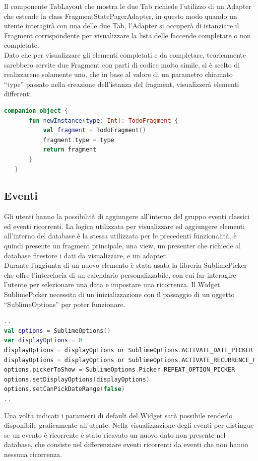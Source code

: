Il componente TabLayout che mostra le due Tab richiede l'utilizzo di un Adapter che estende la class FragmentStatePagerAdapter, in questo modo quando un utente interagirà con una delle due Tab, l'Adapter si occuperà di istanziare il Fragment corrispondente per visualizzare la lista delle faccende completate o non completate.\\
Dato che per visualizzare gli elementi completati e da completare, teoricamente sarebbero servite due Fragment con parti di codice molto simile, si è scelto di realizzarene solamente uno, che in base al valore di un parametro chiamato ``type'' passato nella creazione dell'istanza del fragment, visualizzerà elementi differenti.\\

\begin{lstlisting}[language=kotlin,caption={FragmentTodo.kt}]
companion object {
       fun newInstance(type: Int): TodoFragment {
           val fragment = TodoFragment()
           fragment.type = type
           return fragment
       }
   }
\end{lstlisting}


\subsection{Eventi}
Gli utenti hanno la possibilità di aggiungere all'interno del gruppo eventi classici ed eventi ricorrenti. La logica utilizzata per visualizzare ed aggiungere elementi all'interno del database è la stessa utilizzata per le precedenti funzionalità, è quindi presente un fragment principale, una view, un presenter che richiede al database firestore i dati da visualizzare, e un adapter.\\
Durante l'aggiunta di un nuovo elemento è stata usata la libreria SublimePicker che offre l'interefacia di un calendario personalizzabile, con cui far interagire l'utente per selezionare una data e impostare una ricorrenza. Il Widget SublimePicker necessita di un inizializzazione con il passaggio di un oggetto ``SublimeOptions'' per poter funzionare.\\

\begin{lstlisting}[language=kotlin,caption={Configurazione del Widget SublimePicker}]
..
val options = SublimeOptions()
var displayOptions = 0
displayOptions = displayOptions or SublimeOptions.ACTIVATE_DATE_PICKER
displayOptions = displayOptions or SublimeOptions.ACTIVATE_RECURRENCE_PICKER
options.pickerToShow = SublimeOptions.Picker.REPEAT_OPTION_PICKER
options.setDisplayOptions(displayOptions)
options.setCanPickDateRange(false)
..

\end{lstlisting}
Una volta indicati i parametri di default del Widget sarà possibile renderlo disponibile graficamente all'utente.
Nella visualizzazione degli eventi per distingue se un evento è ricorrente è stato ricavato un nuovo dato non presente nel database, che consiste nel differenziare eventi ricorrenti da eventi che non hanno nessuna ricorrenza.\\

